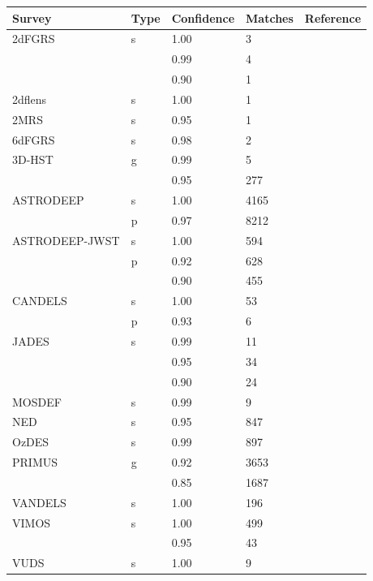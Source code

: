 \begin{table}[!p]
    \centering
    \begin{tabular}{lllll}
        \hline
        Survey & Type & Confidence & Matches& Reference \\
        \hline
        \hline
        2dFGRS & s & 1.00 & 3 & \citet{colless2001} \\
               &   & 0.99 & 4 & \\
               &   & 0.90 & 1 & \\
        2dflens & s & 1.00 & 1 & \citet{blake2016} \\
        2MRS & s & 0.95 & 1 & \citet{huchra2012} \\
        6dFGRS & s & 0.98 & 2 & \citet{jones2009} \\
        3D-HST & g & 0.99 & 5 & \citet{momcheva2016} \\
               &   & 0.95 & 277 & \\
        ASTRODEEP & s & 1.00 & 4165 & \citet{merlin2021} \\
                  & p & 0.97 & 8212 & \\
        ASTRODEEP-JWST & s & 1.00 & 594 & \citet{merlin2024} \\
                       & p & 0.92 & 628 & \\
                       &   & 0.90 & 455 & \\
        CANDELS & s & 1.00 & 53 & \citet{kodra2023} \\
                & p & 0.93 & 6 & \\
        JADES & s & 0.99 & 11 & \citet{deugenio2025} \\
              &   & 0.95 & 34 & \\
              &   & 0.90 & 24 & \\
        MOSDEF & s & 0.99 & 9 & \citet{kriek2015} \\
        NED & s & 0.95 & 847 & \citet{helou1991} \\
        OzDES & s & 0.99 & 897 & \citet{lidman2020} \\
        PRIMUS & g & 0.92 & 3653 & \citet{cool2013} \\
               &   & 0.85 & 1687 & \\
        VANDELS & s & 1.00 & 196 & \citet{garilli2021} \\
        VIMOS & s & 1.00 & 499 & \citet{balestra2010} \\
                  &   & 0.95 & 43 & \\
        VUDS & s & 1.00 & 9 & \citet{tasca2017} \\

\end{tabular}
\end{table}
